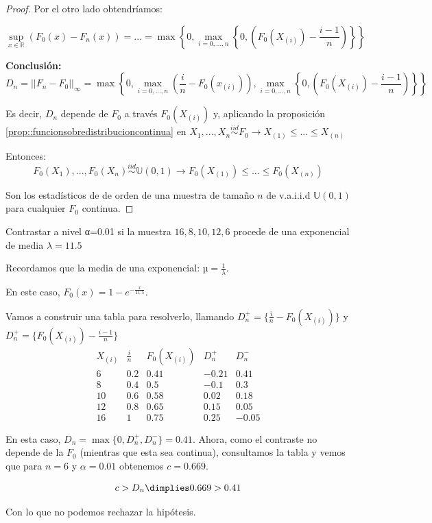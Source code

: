 \begin{proof}
Por el otro lado obtendríamos:

\[
\sup_{x\in ℝ} (F_0(x) - F_n(x)) = ... = \max \left\{0,\max_{i=0,...,n} \left\{0, \left(F_0(X_{(i)}) - \frac{i-1}{n}\right)\right\}\right\}
\]

\textbf{Conclusión:}
\[D_n = ||F_n - F_0||_{\infty} = \max \left\{ 0, \max_{i=0,...,n} \left( \frac{i}{n} - F_0(x_{(i)})\right), \max_{i=0,...,n} \left\{0, \left(F_0(X_{(i)}) - \frac{i-1}{n}\right)\right\}\right\}\]

Es decir, $D_n$ depende de $F_0$ a través $F_0(X_{(i)})$ y, aplicando la proposición \ref{prop::funcionsobredistribucioncontinua} en $X_1,...,X_n \overset{iid}{\sim} F_0 \to X_{(1)} \leq ... \leq X_{(n)}$

Entonces: 
\[
F_0(X_1),...,F_0(X_n) \overset{iid}{\sim} \mathbb{U}(0,1) \to F_0(X_{(1)})\leq ... \leq F_0(X_{(n)})
\]


Son los estadísticos de de orden de una muestra de tamaño $n$ de v.a.i.i.d $\mathbb{U}(0,1)$ para cualquier $F_0$ continua.

\end{proof}

\begin{example}
Contrastar a nivel α=0.01 si la muestra $16,8,10,12,6$ procede de una exponencial de media $λ=11.5$

Recordamos que la media de una exponencial: $µ = \frac{1}{λ}$.

En este caso, $F_0(x) = 1-e^{-\frac{x}{11.5}}$.


Vamos a construir una tabla para resolverlo, llamando $D_n^+ = \{\frac{i}{n} - F_0(X_{(i)})\}$ y $D_n^+ = \{F_0(X_{(i)}) - \frac{i-1}{n} \}$
\[
\begin{array}{cccccc}
X_{(i)} & \frac{i}{n} & F_0(X_{(i)}) & D_n^+ & D_n^-\\\hline
6&0.2&0.41&-0.21&0.41\\
8&0.4&0.5&-0.1&0.3 \\
10&0.6&0.58&0.02&0.18 \\
12&0.8&0.65&0.15&0.05 \\
16&1&0.75&0.25&-0.05
\end{array}\]


En esta caso, $D_n = \max\{0,D_n^+,D_n^-\} = 0.41$. Ahora, como el contraste no depende de la $F_0$ (mientras que esta sea continua), consultamos la tabla y vemos que para $n=6$ y $α=0.01$ obtenemos $c=0.669$.

\[c>D_n \dimplies 0.669 > 0.41\]

Con lo que no podemos rechazar la hipótesis.

\end{example}

